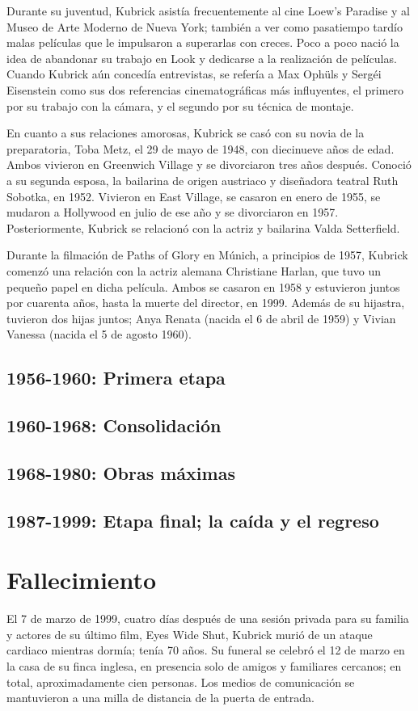 \documentclass[12pt,a4paper]{article}
\begin{document}
Durante su juventud, Kubrick asistía frecuentemente al cine Loew's Paradise y al Museo de Arte Moderno de Nueva York; también a ver como pasatiempo tardío malas películas que le impulsaron a superarlas con creces. Poco a poco nació la idea de abandonar su trabajo en Look y dedicarse a la realización de películas. Cuando Kubrick aún concedía entrevistas, se refería a Max Ophüls y Sergéi Eisenstein como sus dos referencias cinematográficas más influyentes, el primero por su trabajo con la cámara, y el segundo por su técnica de montaje.

En cuanto a sus relaciones amorosas, Kubrick se casó con su novia de la preparatoria, Toba Metz, el 29 de mayo de 1948, con diecinueve años de edad. Ambos vivieron en Greenwich Village y se divorciaron tres años después. Conoció a su segunda esposa, la bailarina de origen austriaco y diseñadora teatral Ruth Sobotka, en 1952. Vivieron en East Village, se casaron en enero de 1955, se mudaron a Hollywood en julio de ese año y se divorciaron en 1957. Posteriormente, Kubrick se relacionó con la actriz y bailarina Valda Setterfield.

Durante la filmación de Paths of Glory en Múnich, a principios de 1957, Kubrick comenzó una relación con la actriz alemana Christiane Harlan, que tuvo un pequeño papel en dicha película. Ambos se casaron en 1958 y estuvieron juntos por cuarenta años, hasta la muerte del director, en 1999. Además de su hijastra, tuvieron dos hijas juntos; Anya Renata (nacida el 6 de abril de 1959) y Vivian Vanessa (nacida el 5 de agosto 1960).
\subsection{1956-1960: Primera etapa}
\subsection{1960-1968: Consolidación}
\subsection{1968-1980: Obras máximas}
\subsection{1987-1999: Etapa final; la caída y el regreso}
\section{Fallecimiento}
El 7 de marzo de 1999, cuatro días después de una sesión privada para su familia y actores de su último film, Eyes Wide Shut, Kubrick murió de un ataque cardiaco mientras dormía; tenía 70 años. Su funeral se celebró el 12 de marzo en la casa de su finca inglesa, en presencia solo de amigos y familiares cercanos; en total, aproximadamente cien personas. Los medios de comunicación se mantuvieron a una milla de distancia de la puerta de entrada.
\end{document}
